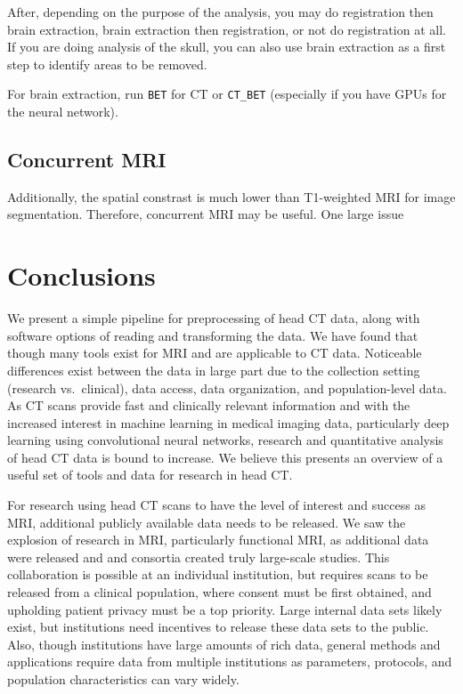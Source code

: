 \documentclass[]{elsarticle} %
\begin{document}
After, depending on the purpose of the analysis, you may do registration
then brain extraction, brain extraction then registration, or not do
registration at all. If you are doing analysis of the skull, you can
also use brain extraction as a first step to identify areas to be
removed.

For brain extraction, run \texttt{BET} for CT or \texttt{CT\_BET}
(especially if you have GPUs for the neural network).

\hypertarget{concurrent-mri}{%
\subsection{Concurrent MRI}\label{concurrent-mri}}

Additionally, the spatial constrast is much lower than T1-weighted MRI
for image segmentation. Therefore, concurrent MRI may be useful. One
large issue

\hypertarget{conclusions}{%
\section{Conclusions}\label{conclusions}}

We present a simple pipeline for preprocessing of head CT data, along
with software options of reading and transforming the data. We have
found that though many tools exist for MRI and are applicable to CT
data. Noticeable differences exist between the data in large part due to
the collection setting (research vs.~clinical), data access, data
organization, and population-level data. As CT scans provide fast and
clinically relevant information and with the increased interest in
machine learning in medical imaging data, particularly deep learning
using convolutional neural networks, research and quantitative analysis
of head CT data is bound to increase. We believe this presents an
overview of a useful set of tools and data for research in head CT.

For research using head CT scans to have the level of interest and
success as MRI, additional publicly available data needs to be released.
We saw the explosion of research in MRI, particularly functional MRI, as
additional data were released and and consortia created truly
large-scale studies. This collaboration is possible at an individual
institution, but requires scans to be released from a clinical
population, where consent must be first obtained, and upholding patient
privacy must be a top priority. Large internal data sets likely exist,
but institutions need incentives to release these data sets to the
public. Also, though institutions have large amounts of rich data,
general methods and applications require data from multiple institutions
as parameters, protocols, and population characteristics can vary
widely.
\end{document}
